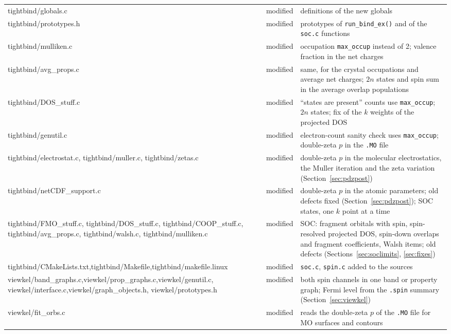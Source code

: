 \documentclass[11pt,a4paper]{article}
\newcommand{\file}[1]{\texttt{#1}}
\newcommand{\fn}[1]{\texttt{#1()}}
\newcommand{\var}[1]{\texttt{#1}}
\begin{document}
\begin{longtable}{>{\ttfamily\small\raggedright}p{4.7cm} c p{8.4cm}}
tightbind/globals.c    & modified & definitions of the new globals \\
tightbind/prototypes.h & modified & prototypes of \fn{run\_bind\_ex} and of the \file{soc.c} functions \\
tightbind/mulliken.c   & modified & occupation \var{max\_occup} instead of 2; valence fraction in the net charges \\
tightbind/avg\_props.c & modified & same, for the crystal occupations and average net charges; $2n$ states and spin sum in the average overlap populations \\
tightbind/DOS\_stuff.c & modified & ``states are present'' counts use \var{max\_occup}; $2n$ states; fix of the $k$ weights of the projected DOS \\
tightbind/genutil.c    & modified & electron-count sanity check uses \var{max\_occup}; double-zeta $p$ in the \texttt{.MO} file \\
tightbind/electrostat.c, tightbind/muller.c, tightbind/zetas.c & modified & double-zeta $p$ in the molecular electrostatics, the Muller iteration and the zeta variation (Section~\ref{sec:pdzpost}) \\
tightbind/netCDF\_support.c & modified & double-zeta $p$ in the atomic parameters; old defects fixed (Section~\ref{sec:pdzpost}); SOC states, one $k$ point at a time \\
tightbind/FMO\_stuff.c, tightbind/DOS\_stuff.c, tightbind/COOP\_stuff.c, tightbind/avg\_props.c, tightbind/walsh.c, tightbind/mulliken.c & modified & SOC: fragment orbitals with spin, spin-resolved projected DOS, spin-down overlaps and fragment coefficients, Walsh items; old defects (Sections~\ref{sec:soclimits}, \ref{sec:fixes}) \\
tightbind/CMakeLists.txt,\newline tightbind/Makefile,\newline tightbind/makefile.linux & modified & \file{soc.c}, \file{spin.c} added to the sources \\
viewkel/band\_graphs.c,\newline viewkel/prop\_graphs.c,\newline viewkel/genutil.c, viewkel/interface.c,\newline viewkel/graph\_objects.h, viewkel/prototypes.h & modified & both spin channels in one band or property graph; Fermi level from the \texttt{.spin} summary (Section~\ref{sec:viewkel}) \\
viewkel/fit\_orbs.c & modified & reads the double-zeta $p$ of the \texttt{.MO} file for MO surfaces and contours \\

\end{longtable}
\end{document}
